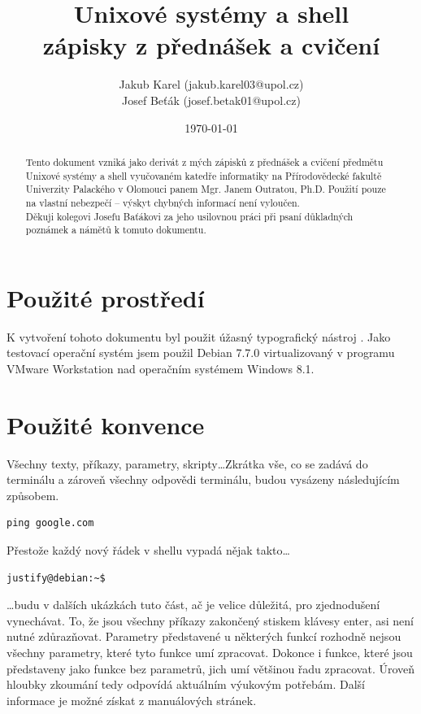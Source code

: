 \documentclass{article}
\title{\Huge{Unixové systémy a shell}\\ \vspace{1em} \normalsize{zápisky z přednášek a cvičení}}
\author{
	\normalsize Jakub Karel (jakub.karel03@upol.cz) \\
	\normalsize Josef Beťák (josef.betak01@upol.cz)}
\date{\today}
\begin{document}
\maketitle

\begin{abstract}
Tento dokument vzniká jako derivát z mých zápisků z přednášek a cvičení předmětu Unixové systémy a shell vyučovaném katedře informatiky na Přírodovědecké fakultě Univerzity Palackého v Olomouci panem Mgr. Janem Outratou, Ph.D. Použití pouze na vlastní nebezpečí -- výskyt chybných informací není vyloučen.\\
Děkuji kolegovi Josefu Baťákovi za jeho usilovnou práci při psaní důkladných poznámek a námětů k tomuto dokumentu.
\end{abstract}

\thispagestyle{empty}
\newpage
\thispagestyle{empty}
\tableofcontents
\thispagestyle{empty}
\newpage

\setcounter{page}{1}
\section{Použité prostředí}
K vytvoření tohoto dokumentu byl použit úžasný typografický nástroj \LaTeXe. Jako testovací operační systém jsem použil Debian 7.7.0 virtualizovaný v programu VMware Workstation nad operačním systémem Windows 8.1.

\section{Použité konvence}
Všechny texty, příkazy, parametry, skripty\dots Zkrátka vše, co se zadává do terminálu a zároveň všechny odpovědi terminálu, budou vysázeny následujícím způsobem. 
\begin{verbatim}
ping google.com
\end{verbatim}
Přestože každý nový řádek v shellu vypadá nějak takto\dots
\begin{verbatim}
justify@debian:~$ 
\end{verbatim}
\dots budu v dalších ukázkách tuto část, ač je velice důležitá, pro zjednodušení vynechávat. To, že jsou všechny příkazy zakončený stiskem klávesy enter, asi není nutné zdůrazňovat. Parametry představené u některých funkcí rozhodně nejsou všechny parametry, které tyto funkce umí zpracovat. Dokonce i funkce, které jsou představeny jako funkce bez parametrů, jich umí většinou řadu zpracovat. Úroveň hloubky zkoumání tedy odpovídá aktuálním výukovým potřebám. Další informace je možné získat z manuálových stránek.
\newpage
\end{document}

